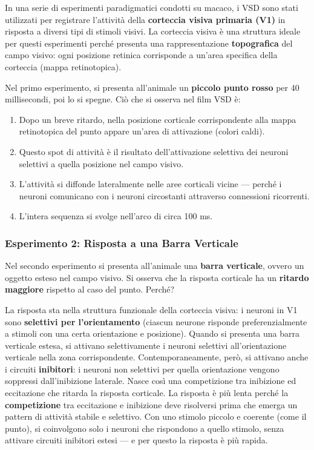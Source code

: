In una serie di esperimenti paradigmatici condotti su macaco, i VSD sono stati utilizzati per registrare l'attività della \textbf{corteccia visiva primaria (V1)} in risposta a diversi tipi di stimoli visivi. La corteccia visiva è una struttura ideale per questi esperimenti perché presenta una rappresentazione \textbf{topografica} del campo visivo: ogni posizione retinica corrisponde a un'area specifica della corteccia (mappa retinotopica).

Nel primo esperimento, si presenta all'animale un \textbf{piccolo punto rosso} per 40 millisecondi, poi lo si spegne. Ciò che si osserva nel film VSD è:

\begin{enumerate}
    \item Dopo un breve ritardo, nella posizione corticale corrispondente alla mappa retinotopica del punto appare un'area di attivazione (colori caldi).
    \item Questo spot di attività è il risultato dell'attivazione selettiva dei neuroni selettivi a quella posizione nel campo visivo.
    \item L'attività si diffonde lateralmente nelle aree corticali vicine — perché i neuroni comunicano con i neuroni circostanti attraverso connessioni ricorrenti.
    \item L'intera sequenza si svolge nell'arco di circa 100 ms.
\end{enumerate}

\subsubsection{Esperimento 2: Risposta a una Barra Verticale}

Nel secondo esperimento si presenta all'animale una \textbf{barra verticale}, ovvero un oggetto esteso nel campo visivo. Si osserva che la risposta corticale ha un \textbf{ritardo maggiore} rispetto al caso del punto. Perché?

La risposta sta nella struttura funzionale della corteccia visiva: i neuroni in V1 sono \textbf{selettivi per l'orientamento} (ciascun neurone risponde preferenzialmente a stimoli con una certa orientazione e posizione). Quando si presenta una barra verticale estesa, si attivano selettivamente i neuroni selettivi all'orientazione verticale nella zona corrispondente. Contemporaneamente, però, si attivano anche i circuiti \textbf{inibitori}: i neuroni non selettivi per quella orientazione vengono soppressi dall'inibizione laterale.
Nasce così una competizione tra inibizione ed eccitazione che ritarda la risposta corticale.
La risposta è più lenta perché la \textbf{competizione} tra eccitazione e inibizione deve risolversi prima che emerga un pattern di attività stabile e selettivo. Con uno stimolo piccolo e coerente (come il punto), si coinvolgono solo i neuroni che rispondono a quello stimolo, senza attivare circuiti inibitori estesi — e per questo la risposta è più rapida.

